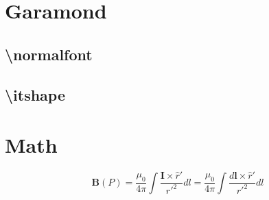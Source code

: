 \documentclass[danish,a4paper,11pt]{scrartcl}
\begin{document}
\section*{Garamond}
\subsection*{\textbackslash normalfont}
\normalfont\normalfont

\subsection*{\textbackslash itshape}
\normalfont\itshape

\section{Math}
\normalfont
\[
\mathbf{B}(P)=\frac{\mu_0}{4\pi}\int\frac{\mathbf{I}\times\hat{r}'}{r'^2}dl = \frac{\mu_0}{4\pi}\int\frac{d\mathbf{l}\times\hat{r}'}{r'^2}dl
\]
\end{document}
